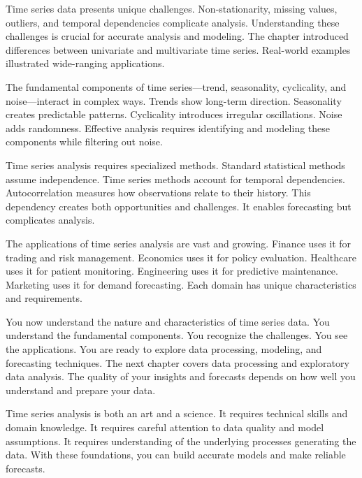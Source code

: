 Time series data presents unique challenges. Non-stationarity, missing values, outliers, and temporal dependencies complicate analysis. Understanding these challenges is crucial for accurate analysis and modeling. The chapter introduced differences between univariate and multivariate time series. Real-world examples illustrated wide-ranging applications.

The fundamental components of time series—trend, seasonality, cyclicality, and noise—interact in complex ways. Trends show long-term direction. Seasonality creates predictable patterns. Cyclicality introduces irregular oscillations. Noise adds randomness. Effective analysis requires identifying and modeling these components while filtering out noise.

Time series analysis requires specialized methods. Standard statistical methods assume independence. Time series methods account for temporal dependencies. Autocorrelation measures how observations relate to their history. This dependency creates both opportunities and challenges. It enables forecasting but complicates analysis.

The applications of time series analysis are vast and growing. Finance uses it for trading and risk management. Economics uses it for policy evaluation. Healthcare uses it for patient monitoring. Engineering uses it for predictive maintenance. Marketing uses it for demand forecasting. Each domain has unique characteristics and requirements.

You now understand the nature and characteristics of time series data. You understand the fundamental components. You recognize the challenges. You see the applications. You are ready to explore data processing, modeling, and forecasting techniques. The next chapter covers data processing and exploratory data analysis. The quality of your insights and forecasts depends on how well you understand and prepare your data.

Time series analysis is both an art and a science. It requires technical skills and domain knowledge. It requires careful attention to data quality and model assumptions. It requires understanding of the underlying processes generating the data. With these foundations, you can build accurate models and make reliable forecasts.


